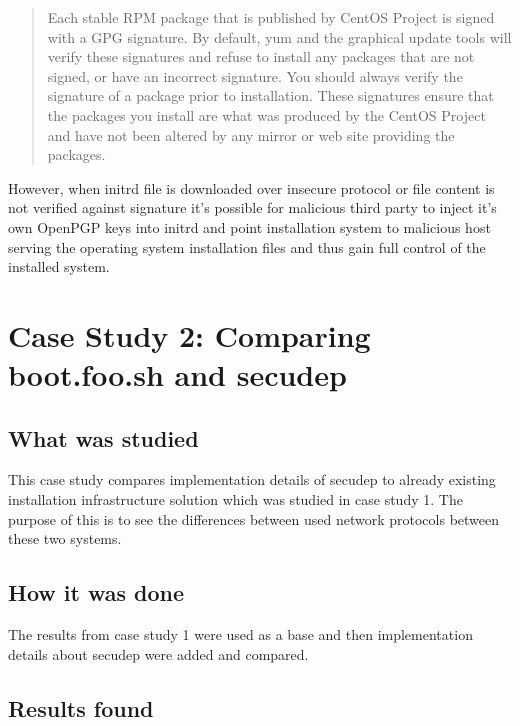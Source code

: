 \begin{quote}
Each stable RPM package that is published by CentOS Project is signed
with a GPG signature. By default, yum and the graphical update tools
will verify these signatures and refuse to install any packages that
are not signed, or have an incorrect signature. You should always
verify the signature of a package prior to installation. These
signatures ensure that the packages you install are what was produced
by the CentOS Project and have not been altered by any mirror or
web site providing the packages.
\end{quote}

However, when initrd file is downloaded over insecure protocol or file
content is not verified against signature it's possible for malicious
third party to inject it's own OpenPGP keys into initrd and point
installation system to malicious host serving the operating system
installation files and thus gain full control of the installed system.


\section{Case Study 2: Comparing boot.foo.sh and secudep}
\label{sec:casestudy2}

\subsection{What was studied}

This case study compares implementation details of secudep to already
existing installation infrastructure solution which was studied in
case study 1. The purpose of this is to see the differences between
used network protocols between these two systems.

\subsection{How it was done}

The results from case study 1 were used as a base and then
implementation details about secudep were added and compared.

\subsection{Results found}

